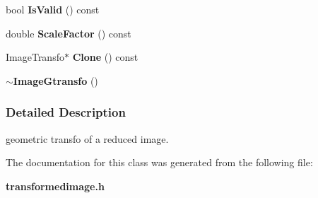 \begin{CompactItemize}
\item 
{}
bool {\bf Is\-Valid} () const\label{class_imagegtransfo_a12}

\item 
{}
double {\bf Scale\-Factor} () const\label{class_imagegtransfo_a13}

\item 
{}
Image\-Transfo$\ast$ {\bf Clone} () const\label{class_imagegtransfo_a14}

\item 
{}
{\bf $\sim$Image\-Gtransfo} ()\label{class_imagegtransfo_a15}

\end{CompactItemize}


\subsubsection{Detailed Description}
geometric transfo of a reduced image. 



The documentation for this class was generated from the following file:\begin{CompactItemize}
\item 
{\bf transformedimage.h}\end{CompactItemize}
